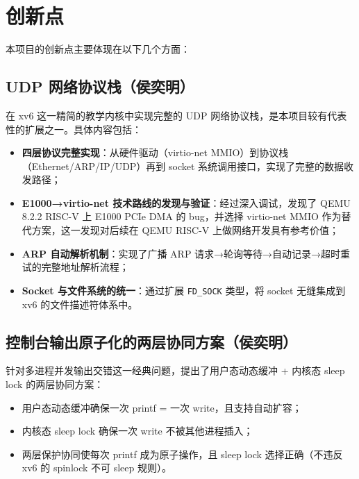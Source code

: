 \documentclass[12pt,a4paper]{ctexart}
\begin{document}
\newpage

\section{创新点}

本项目的创新点主要体现在以下几个方面：

\subsection{UDP 网络协议栈（侯奕明）}

在 xv6 这一精简的教学内核中实现完整的 UDP 网络协议栈，是本项目较有代表性的扩展之一。具体内容包括：

\begin{itemize}
  \item \textbf{四层协议完整实现}：从硬件驱动（virtio-net MMIO）到协议栈（Ethernet/ARP/IP/UDP）再到 socket 系统调用接口，实现了完整的数据收发路径；
  \item \textbf{E1000→virtio-net 技术路线的发现与验证}：经过深入调试，发现了 QEMU 8.2.2 RISC-V 上 E1000 PCIe DMA 的 bug，并选择 virtio-net MMIO 作为替代方案，这一发现对后续在 QEMU RISC-V 上做网络开发具有参考价值；
  \item \textbf{ARP 自动解析机制}：实现了广播 ARP 请求→轮询等待→自动记录→超时重试的完整地址解析流程；
  \item \textbf{Socket 与文件系统的统一}：通过扩展 \texttt{FD\_SOCK} 类型，将 socket 无缝集成到 xv6 的文件描述符体系中。
\end{itemize}

\subsection{控制台输出原子化的两层协同方案（侯奕明）}

针对多进程并发输出交错这一经典问题，提出了用户态动态缓冲 + 内核态 sleep lock 的两层协同方案：
\begin{itemize}
  \item 用户态动态缓冲确保一次 printf = 一次 write，且支持自动扩容；
  \item 内核态 sleep lock 确保一次 write 不被其他进程插入；
  \item 两层保护协同使每次 printf 成为原子操作，且 sleep lock 选择正确（不违反 xv6 的 spinlock 不可 sleep 规则）。
\end{itemize}
\end{document}
